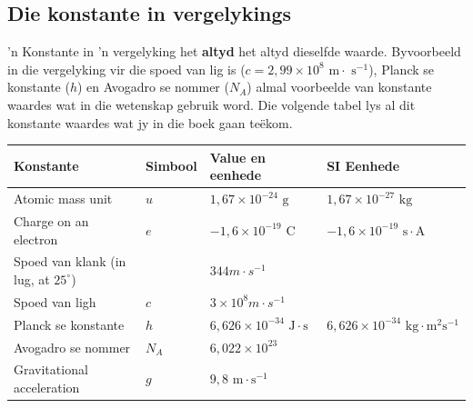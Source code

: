 \subsection*{Die konstante in vergelykings}
 'n Konstante in  'n vergelyking het \textbf{altyd} het altyd dieselfde waarde. Byvoorbeeld in die vergelyking vir die spoed van lig is ($c = 2,99 \times 10^{8} \text{ m} \cdot \text{ s}^{-1}$), Planck se konstante ($h$) en Avogadro se nommer ($N_A$) almal voorbeelde van konstante waardes wat in die wetenskap gebruik word. Die volgende tabel lys al dit konstante waardes wat jy in die boek gaan teëkom.
\begin{table}[H]
 \begin{center}
  \begin{tabular}{|l|l|l|l|}\hline
   \textbf{Konstante} & Simbool & \textbf{Value en eenhede} & \textbf{SI Eenhede} \\ \hline
Atomic mass unit & $u$ & $1,67 \times 10^{-24} \text{ g}$ & $1,67 \times 10^{-27} \text{ kg}$ \\ \hline
Charge on an electron & $e$ & $-1,6 \times 10^{-19} \text{ C}$ & $-1,6 \times 10^{-19} \text{ s}\cdot \text{A}$ \\ \hline
Spoed van klank (in lug, at $25^{\circ}$) & & \multicolumn{2}{l|}{$344 m \cdot s^{-1}$} \\ \hline
Spoed van ligh & $c$ & \multicolumn{2}{l|}{$3 \times 10^{8} m \cdot s^{-1}$} \\ \hline
Planck se konstante & $h$ & $6,626 \times 10^{-34} \text{ J} \cdot \text{s}$ & $6,626 \times 10^{-34} \text{ kg} \cdot \text{m}^{2} \text{s}^{-1}$ \\ \hline
Avogadro se nommer & $N_{A}$ & \multicolumn{2}{l|}{$6,022 \times 10^{23}$} \\ \hline
Gravitational acceleration & $g$ & \multicolumn{2}{l|}{$9,8 \text{ m} \cdot \text{s}^{-1}$} \\ \hline  
  \end{tabular}
 \end{center}
\end{table}

